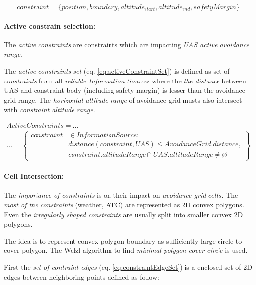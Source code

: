 \begin{equation}\label{eq:staticConstraint}
    constraint = \{position,boundary, altitude_{start},altitude_{end}, safety Margin\}
\end{equation}

\paragraph{Active constrain selection:} The \emph{active constraints} are constraints which are impacting \emph{UAS active avoidance range}. 

The \emph{active constraints set} (eq. \ref{eq:activeConstraintSet}) is defined as set of \emph{constraints} from all \emph{reliable Information Sources} where the \emph{the distance} between UAS and constraint body (including safety margin) is lesser than the avoidance grid range. The \emph{horizontal altitude range} of avoidance grid musts also intersect with \emph{constraint altitude range}.

\begin{multline}\label{eq:activeConstraintSet}
    Active Constraints = \dots\\\dots =
    \left\{\begin{aligned}constraint& \in Information Source:\\ 
    &distance(constraint,UAS) \le Avoidance Grid. distance,\\
    &constraint.altitude Range \cap UAS.altitude Range \neq \varnothing 
    \end{aligned}\right\}
\end{multline}

\paragraph{Cell Intersection:} The \emph{importance of constraints} is on their impact on \emph{avoidance grid} $cells$. The \emph{most of the constraints} (weather, ATC) are represented as 2D convex polygons. Even the \emph{irregularly shaped constraints} are usually split into smaller convex 2D polygons.

The idea is to represent convex polygon boundary as sufficiently large circle to cover polygon. The Welzl algorithm to find \emph{minimal polygon cover circle} \cite{welzl1991smallest} is used.

First the \emph{set of contraint edges} (eq. \ref{eq:constraintEdgeSet}) is a enclosed set of 2D edges between neighboring points defined as follow:


